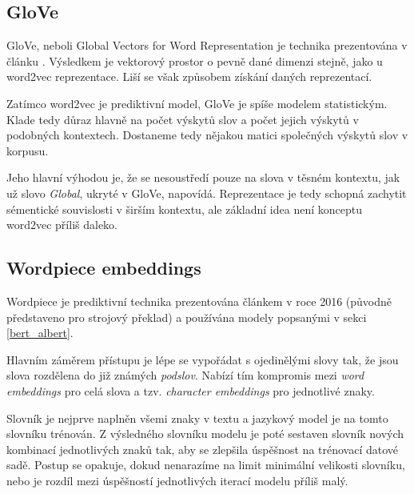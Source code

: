 
\subsection{GloVe}

GloVe, neboli Global Vectors for Word Representation je technika prezentována v článku \cite{GloVe}. Výsledkem je vektorový prostor o pevně dané dimenzi stejně, jako u word2vec reprezentace. Liší se však způsobem získání daných reprezentací.\par Zatímco word2vec je prediktivní model, GloVe je spíše modelem statistickým. Klade tedy důraz hlavně na počet výskytů slov a počet jejich výskytů v podobných kontextech. Dostaneme tedy nějakou matici společných výskytů slov v korpusu.\par
Jeho hlavní výhodou je, že se nesoustředí pouze na slova v těsném kontextu, jak už slovo \emph{Global}, ukryté v GloVe, napovídá. Reprezentace je tedy schopná zachytit sémentické souvislosti v širším kontextu, ale základní idea není konceptu word2vec příliš daleko.


\subsection{Wordpiece embeddings}
\label{wordpiece_embb}
Wordpiece je prediktivní technika prezentována článkem \cite{wordpiece} v roce 2016 (původně představeno pro strojový překlad) a používána modely popsanými v sekci \ref{bert_albert}.\par
Hlavním záměrem přístupu je lépe se vypořádat s ojedinělými slovy tak, že jsou slova rozdělena do již známých \emph{podslov}. Nabízí tím kompromis mezi \emph{word embeddings} pro celá slova a tzv. \emph{character embeddings} pro jednotlivé znaky.\par
Slovník je nejprve naplněn všemi znaky v textu a jazykový model je na tomto slovníku trénován. Z výsledného slovníku modelu je poté sestaven slovník nových kombinací jednotlivých znaků tak, aby se zlepšila úspěšnost na trénovací datové sadě. Postup se opakuje, dokud nenarazíme na limit minimální velikosti slovníku, nebo je rozdíl mezi úspěšností jednotlivých iterací modelu příliš malý.

